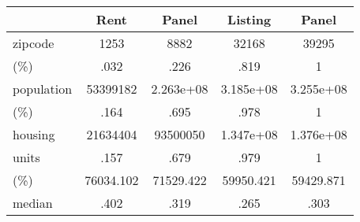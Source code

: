 \begin{table}[htbp]
\begin{tabular}{|l|c|c|c|c|}\hline  
 & Rent  & Panel  & Listing  & Panel  \\ \hline  
zipcode & 1253 & 8882 & 32168 & 39295 \\ \hline 
(\%) & .032 & .226 & .819 & 1 \\ \hline 
population & 53399182 & 2.263e+08 & 3.185e+08 & 3.255e+08 \\ \hline 
(\%) & .164 & .695 & .978 & 1 \\ \hline 
housing & 21634404 & 93500050 & 1.347e+08 & 1.376e+08 \\ \hline 
units & .157 & .679 & .979 & 1 \\ \hline 
(\%) & 76034.102 & 71529.422 & 59950.421 & 59429.871 \\ \hline 
median & .402 & .319 & .265 & .303 \\ \hline 
  \end{tabular}
\end{table}
